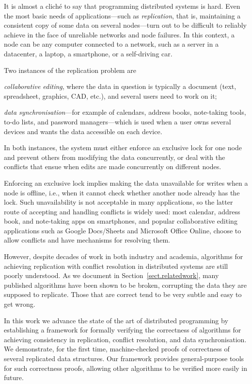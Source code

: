 \documentclass[acmlarge,review,anonymous]{acmart}\settopmatter{printfolios=true}
\begin{document}
It is almost a clich{\' e} to say that programming distributed systems is hard. Even the most basic
needs of applications---such as \emph{replication}, that is, maintaining a consistent copy of some
data on several nodes---turn out to be difficult to reliably achieve in the face of unreliable
networks and node failures. In this context, a node can be any computer connected to a network, such
as a server in a datacenter, a laptop, a smartphone, or a self-driving car.

Two instances of the replication problem are
\begin{inparaenum}
\item \emph{collaborative editing}, where the data in question is typically a document (text,
    spreadsheet, graphics, CAD, etc.), and several users need to work on it;
\item \emph{data synchronisation}---for example of calendars, address books, note-taking tools,
    to-do lists, and password managers---which is used when a user owns several devices and wants
    the data accessible on each device.
\end{inparaenum}
In both instances, the system must either enforce an exclusive lock for one node and prevent others
from modifying the data concurrently, or deal with the conflicts that ensue when edits are made
concurrently on different nodes.

Enforcing an exclusive lock implies making the data unavailable for writes when a node is offline,
i.e., when it cannot check whether another node already has the lock. Such unavailability is not
acceptable in many applications, so the latter route of accepting and handling conflicts is widely
used: most calendar, address book, and note-taking apps on smartphones, and popular collaborative
editing applications such as Google Docs/Sheets and Microsoft Office Online, choose to allow
conflicts and have mechanisms for resolving them.

However, despite decades of work in both industry and academia, algorithms for achieving replication
with conflict resolution in distributed systems are still poorly understood. As we document in
Section~\ref{sect.relatedwork}, many published algorithms have been shown to be broken, corrupting
the data they are supposed to replicate. Those that are correct tend to be very subtle and easy to
get wrong.

In this work we advance the state of the art of distributed programming by establishing a framework
for formally verifying the correctness of algorithms for achieving consistency in replication,
conflict resolution, and data synchronisation. We demonstrate, for the first time, machine-checked
proofs of correctness of several replicated data structures. Our framework provides general-purpose
tools for such correctness proofs, allowing other algorithms to be verified more easily in future.
\end{document}
